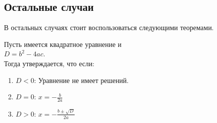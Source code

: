 \newpage

\subsection{Остальные случаи}

В остальных случаях стоит воспользоваться следующими теоремами.

\begin{theorem}
	Пусть имеется квадратное уравнение и \\ $D = b^2 - 4ac$. \\
	Тогда утверждается, что если:
	\begin{enumerate}
		\item $D < 0$:
			Уравнение не имеет решений.
		\item $D = 0$:
			$x = - \frac{b}{2a}$
		\item $D > 0$:
			$x = - \frac{b \pm \sqrt{D}}{2a}$
	\end{enumerate}
\end{theorem}

